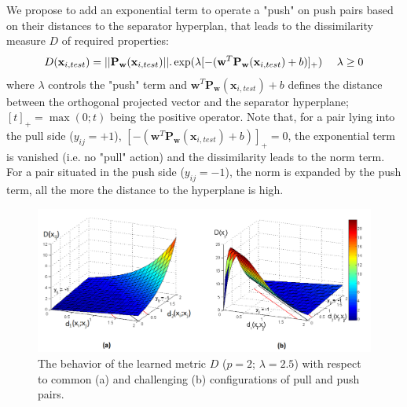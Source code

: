 We propose to add an exponential term to operate a "push" on push pairs based on their distances to the separator hyperplan, that leads to the dissimilarity measure $D$ of required properties:
\begin{equation}
D(\textbf{x}_{i,test}) = 
||\textbf{P}_\textbf{w}(\textbf{x}_{i,test})||.
\exp(\lambda[-(\textbf{w}^T\textbf{P}_\textbf{w}(\textbf{x}_{i,test}) + b)]_+)
\text{ \quad  } \lambda \geq 0
\label{eq:dissimilarity_learn}
\end{equation}
where $\lambda$ controls the "push" term and $\textbf{w}^T\textbf{P}_\textbf{w}(\textbf{x}_{i,test}) + b$ defines the distance between the orthogonal projected vector and the separator hyperplane; $[t]_+ = \max(0; t)$ being the positive operator. Note that, for a pair lying into the pull side ($y_{ij} = +1$), $[-(\textbf{w}^T\textbf{P}_\textbf{w}(\textbf{x}_{i,test}) + b)]_+ = 0$, the exponential term is vanished (i.e. no "pull" action) and the dissimilarity leads to the norm term. For a pair situated in the push side ($y_{ij} = -1$), the norm is expanded by the push term, all the more the distance to the hyperplane is high.

\begin{figure}[h!]
	\centering
	\includegraphics[width=0.855\linewidth]{images/3D_diss}
	\caption{The behavior of the learned metric $D$ ($p = 2$; $\lambda = 2.5$) with respect to common (a) and challenging (b) configurations of pull and push pairs.}
	\label{fig:3D_diss}
\end{figure}


